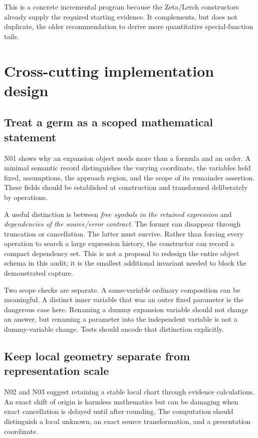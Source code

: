 \documentclass[11pt,a4paper]{article}
\begin{document}
This is a concrete incremental program because the Zeta/Lerch constructors already supply the required starting evidence. It complements, but does not duplicate, the older recommendation to derive more quantitative special-function tails.

\section{Cross-cutting implementation design}\label{sec:design}

\subsection{Treat a germ as a scoped mathematical statement}

N01 shows why an expansion object needs more than a formula and an order. A minimal semantic record distinguishes the varying coordinate, the variables held fixed, assumptions, the approach region, and the scope of its remainder assertion. These fields should be established at construction and transformed deliberately by operations.

A useful distinction is between \emph{free symbols in the retained expression} and \emph{dependencies of the source/error contract}. The former can disappear through truncation or cancellation. The latter must survive. Rather than forcing every operation to search a large expression history, the constructor can record a compact dependency set. This is not a proposal to redesign the entire object schema in this audit; it is the smallest additional invariant needed to block the demonstrated capture.

Two scope checks are separate. A same-variable ordinary composition can be meaningful. A distinct inner variable that was an outer fixed parameter is the dangerous case here. Renaming a dummy expansion variable should not change an answer, but renaming a parameter into the independent variable is not a dummy-variable change. Tests should encode that distinction explicitly.

\subsection{Keep local geometry separate from representation scale}

N02 and N03 suggest retaining a stable local chart through evidence calculations. An exact shift of origin is harmless mathematics but can be damaging when exact cancellation is delayed until after rounding. The computation should distinguish a local unknown, an exact source transformation, and a presentation coordinate.
\end{document}
